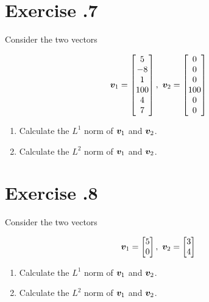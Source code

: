\documentclass{article}
\begin{document}
\section*{Exercise \chapnumber.7}

Consider the two vectors

\begin{equation}
\vv_{1}
=
\begin{bmatrix}
    5\\
    -8\\
    1\\
    100\\
    4\\
    7
\end{bmatrix},\ 
\vv_{2}
=
\begin{bmatrix}
    0\\
    0\\
    0\\
    100\\
    0\\
    0
\end{bmatrix}
\end{equation}

\begin{enumerate}[label=(\alph*)]

\item Calculate the $\textit{L}^{1}$ norm of ${\bm{v}}_{1}$ and ${\bm{v}}_{2}$.

\item Calculate the $\textit{L}^{2}$ norm of ${\bm{v}}_{1}$ and ${\bm{v}}_{2}$.
\end{enumerate}

\section*{Exercise \chapnumber.8}

Consider the two vectors

\begin{equation}
\vv_{1}
=
\begin{bmatrix}
    5\\
    0\\
\end{bmatrix},\ 
\vv_{2}
=
\begin{bmatrix}
    3\\
    4
\end{bmatrix}
\end{equation}

\begin{enumerate}[label=(\alph*)]

\item Calculate the $\textit{L}^{1}$ norm of ${\bm{v}}_{1}$ and ${\bm{v}}_{2}$.

\item Calculate the $\textit{L}^{2}$ norm of ${\bm{v}}_{1}$ and ${\bm{v}}_{2}$.
\end{enumerate}
\end{document}
